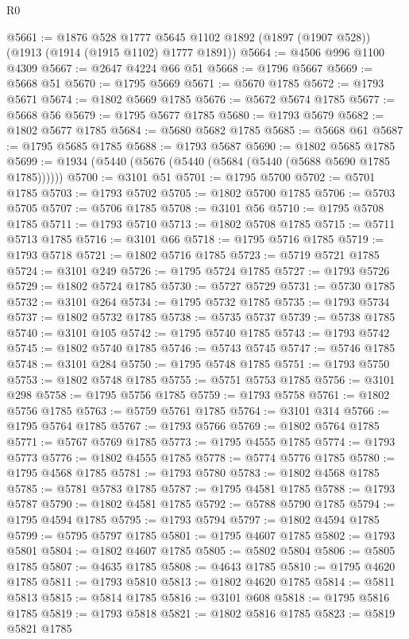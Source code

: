 \begin{lexlean}{R0}
\begin{coremodule}
@5661 := @1876
    @528
    @1777
    @5645
    @1102
    @1892
    (@1897 (@1907 @528))
    (@1913 (@1914 (@1915 @1102) @1777 @1891))
@5664 := @4506 @996 @1100 @4309
@5667 := @2647 @4224 @66 @51
@5668 := @1796 @5667
@5669 := @5668 @51
@5670 := @1795 @5669
@5671 := @5670 @1785
@5672 := @1793 @5671
@5674 := @1802 @5669 @1785
@5676 := @5672 @5674 @1785
@5677 := @5668 @56
@5679 := @1795 @5677 @1785
@5680 := @1793 @5679
@5682 := @1802 @5677 @1785
@5684 := @5680 @5682 @1785
@5685 := @5668 @61
@5687 := @1795 @5685 @1785
@5688 := @1793 @5687
@5690 := @1802 @5685 @1785
@5699 := @1934 (@5440 (@5676 (@5440 (@5684 (@5440 (@5688 @5690 @1785 @1785))))))
@5700 := @3101 @51
@5701 := @1795 @5700
@5702 := @5701 @1785
@5703 := @1793 @5702
@5705 := @1802 @5700 @1785
@5706 := @5703 @5705
@5707 := @5706 @1785
@5708 := @3101 @56
@5710 := @1795 @5708 @1785
@5711 := @1793 @5710
@5713 := @1802 @5708 @1785
@5715 := @5711 @5713 @1785
@5716 := @3101 @66
@5718 := @1795 @5716 @1785
@5719 := @1793 @5718
@5721 := @1802 @5716 @1785
@5723 := @5719 @5721 @1785
@5724 := @3101 @249
@5726 := @1795 @5724 @1785
@5727 := @1793 @5726
@5729 := @1802 @5724 @1785
@5730 := @5727 @5729
@5731 := @5730 @1785
@5732 := @3101 @264
@5734 := @1795 @5732 @1785
@5735 := @1793 @5734
@5737 := @1802 @5732 @1785
@5738 := @5735 @5737
@5739 := @5738 @1785
@5740 := @3101 @105
@5742 := @1795 @5740 @1785
@5743 := @1793 @5742
@5745 := @1802 @5740 @1785
@5746 := @5743 @5745
@5747 := @5746 @1785
@5748 := @3101 @284
@5750 := @1795 @5748 @1785
@5751 := @1793 @5750
@5753 := @1802 @5748 @1785
@5755 := @5751 @5753 @1785
@5756 := @3101 @298
@5758 := @1795 @5756 @1785
@5759 := @1793 @5758
@5761 := @1802 @5756 @1785
@5763 := @5759 @5761 @1785
@5764 := @3101 @314
@5766 := @1795 @5764 @1785
@5767 := @1793 @5766
@5769 := @1802 @5764 @1785
@5771 := @5767 @5769 @1785
@5773 := @1795 @4555 @1785
@5774 := @1793 @5773
@5776 := @1802 @4555 @1785
@5778 := @5774 @5776 @1785
@5780 := @1795 @4568 @1785
@5781 := @1793 @5780
@5783 := @1802 @4568 @1785
@5785 := @5781 @5783 @1785
@5787 := @1795 @4581 @1785
@5788 := @1793 @5787
@5790 := @1802 @4581 @1785
@5792 := @5788 @5790 @1785
@5794 := @1795 @4594 @1785
@5795 := @1793 @5794
@5797 := @1802 @4594 @1785
@5799 := @5795 @5797 @1785
@5801 := @1795 @4607 @1785
@5802 := @1793 @5801
@5804 := @1802 @4607 @1785
@5805 := @5802 @5804
@5806 := @5805 @1785
@5807 := @4635 @1785
@5808 := @4643 @1785
@5810 := @1795 @4620 @1785
@5811 := @1793 @5810
@5813 := @1802 @4620 @1785
@5814 := @5811 @5813
@5815 := @5814 @1785
@5816 := @3101 @608
@5818 := @1795 @5816 @1785
@5819 := @1793 @5818
@5821 := @1802 @5816 @1785
@5823 := @5819 @5821 @1785

\end{coremodule}
\end{lexlean}
